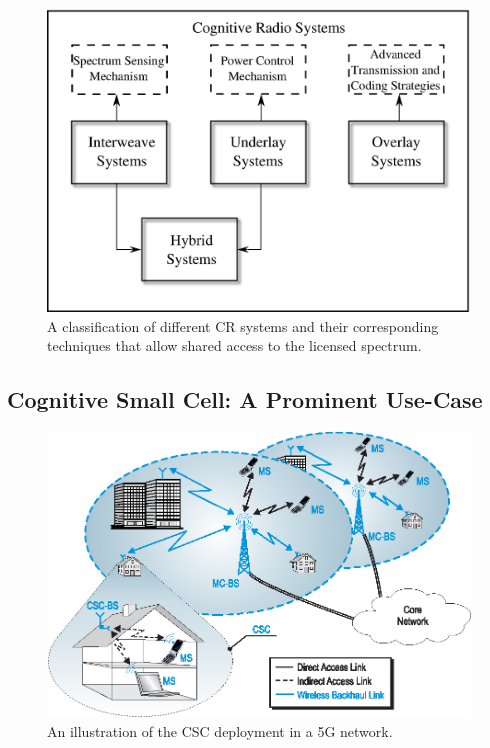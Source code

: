 \begin{figure}
\centering
\includegraphics[width = 0.85 \columnwidth]{figures/CR_paradigm}
\caption{A classification of different CR systems and their corresponding techniques that allow shared access to the licensed spectrum.}
\label{fig_Int:paradigm}
\end{figure}



\subsection{Cognitive Small Cell: A Prominent Use-Case }
\begin{figure}
\centering
\includegraphics[width = 0.9 \columnwidth]{figures/Cellular_Scenario_CR6F}
\caption{An illustration of the CSC deployment in a 5G network.}
\label{fig_Int:archi}
\end{figure}




